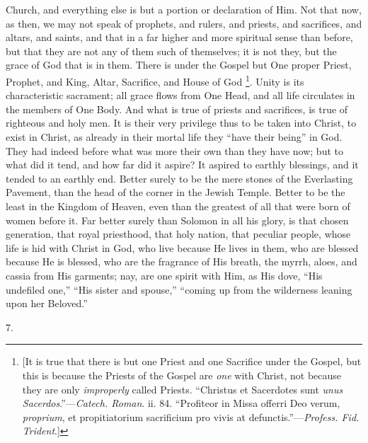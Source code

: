 Church, and everything else is but a portion or declaration of Him.
Not that now, as then, we may not speak of prophets, and rulers, and
priests, and sacrifices, and altars, and saints, and that in a far
higher and more spiritual sense than before, but that they are not any
of them such of themselves; it is not they, but the grace of God that
is in them. There is under the Gospel but One proper Priest, Prophet,
and King, Altar, Sacrifice, and House of God \footnote{[It is true
that there is but one Priest and one Sacrifice under the Gospel, but
this is because the Priests of the Gospel are \emph{one} with Christ,
not because they are only \emph{improperly} called Priests. ``Christus
et Sacerdotes sunt \emph{unus Sacerdos}.''—\emph{Catech. Roman}.
ii. 84. ``Profiteor in Missa offerri Deo verum, \emph{proprium},
et propitiatorium sacrificium pro vivis at defunctis.''—\emph{Profess.
Fid. Trident}.]}. Unity is its characteristic sacrament; all grace flows from
One Head, and all life circulates in the members of One Body. And what
is true of priests and sacrifices, is true of righteous and holy men.
It is their very privilege thus to be taken into Christ, to exist in
Christ, as already in their mortal life they ``have their
being'' in God. They had indeed before what was more their own
than they have now; but to what did it tend, and how far did it
aspire? It aspired to earthly blessings, and it tended to an earthly
end. Better surely to be the mere stones of the Everlasting
Pavement, than the head of the corner in the Jewish Temple. Better to
be the least in the Kingdom of Heaven, even than the greatest of all
that were born of women before it. Far better surely than Solomon in
all his glory, is that chosen generation, that royal priesthood, that
holy nation, that peculiar people, whose life is hid with Christ in
God, who live because He lives in them, who are blessed because He is
blessed, who are the fragrance of His breath, the myrrh, aloes, and
cassia from His garments; nay, are one spirit with Him, as His dove,
``His undefiled one,'' ``His sister and spouse,''
``coming up from the wilderness leaning upon her Beloved.''

7.

